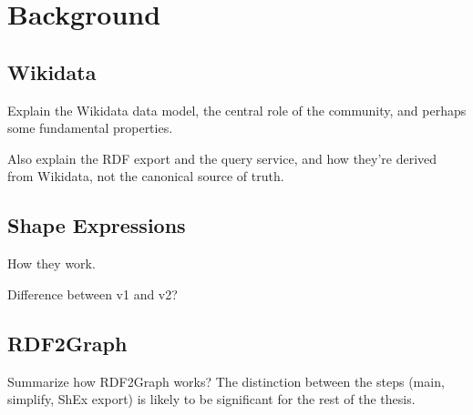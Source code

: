 
\chapter{Background}
\label{ch:Background}


\section{Wikidata}
\label{ch:Background:Wikidata}

Explain the Wikidata data model,
the central role of the community,
and perhaps some fundamental properties.

Also explain the RDF export
and the query service,
and how they’re derived from Wikidata,
not the canonical source of truth.


\section{Shape Expressions}
\label{ch:Background:ShEx}

How they work.

Difference between v1 and v2?


\section{RDF2Graph}
\label{ch:Background:RDF2Graph}

Summarize how RDF2Graph works?
The distinction between the steps
(main, simplify, ShEx export)
is likely to be significant for the rest of the thesis.
